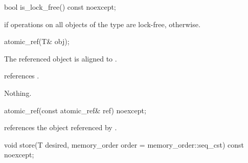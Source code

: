 %
%
%
%
\begin{itemdecl}
bool is_lock_free() const noexcept;
\end{itemdecl}

\begin{itemdescr}
\pnum
\returns
{} if operations on all objects of the type 
are lock-free,
 otherwise.
\end{itemdescr}

%
%
%
%
\begin{itemdecl}
atomic_ref(T& obj);
\end{itemdecl}

\begin{itemdescr}
\pnum
\expects
The referenced object is aligned to .

\pnum
\ensures
{} references .

\pnum
\throws
Nothing.
\end{itemdescr}

%
%
%
%
\begin{itemdecl}
atomic_ref(const atomic_ref& ref) noexcept;
\end{itemdecl}

\begin{itemdescr}
\pnum
\ensures
{} references the object referenced by .
\end{itemdescr}

%
%
%
%
\begin{itemdecl}
void store(T desired, memory_order order = memory_order::seq_cst) const noexcept;
\end{itemdecl}

